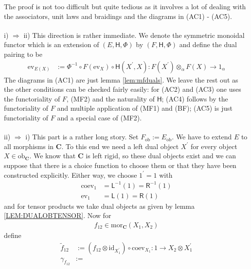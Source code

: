 \begin{prf}
The proof is not too difficult but quite tedious as it involves a lot of dealing with the associators, unit laws and braidings and the diagrams in (AC1) - (AC5).
\\\\
i) $\Rightarrow$ ii)
\qquad
This direction is rather immediate. We denote the symmetric monoidal functor which is an extension of $(E,\mathsf{H},\Phi)$ by $(F,\mathsf{H},\Phi)$ and define the dual pairing to be
\begin{align*}
  \mathrm{ev}_{E(X)}
  &:=
  \Phi^{-1}
  \circ
  F(\mathrm{ev}_{X})
  \circ
  \mathsf{H}(X^{\prime},X)
  \colon
  F(X^{\prime})
  \otimes_{\alpha}
  F(X)
  \to
  1_{\alpha}
\end{align*}
The diagrams in (AC1) are just lemma \ref{lem:mfduals}. We leave the rest out as the other conditions can be checked fairly easily: for (AC2) and (AC3) one uses the functoriality of $F$, (MF2) and the naturality of $\mathsf{H}$; (AC4) follows by the functoriality of $F$ and multiple application of (MF1) and (BF); (AC5) is just functoriality of $F$ and a special case of (MF2).
\\\\
ii) $\Rightarrow$ i)
\qquad
This part is a rather long story. Set $F_{\mathrm{ob}} := E_{\mathrm{ob}}$. We have to extend $E$ to all morphisms in $\mathbf{C}$. To this end we need a left dual object $X^{\prime}$ for every object $X \in \mathrm{ob}_{\mathbf{C}}$. We know that $\mathbf{C}$ is left rigid, so these dual objects exist and we can suppose that there is a choice function to choose them or that they have been constructed explicitly. Either way, we choose $1^{\prime} = 1$ with
\begin{align*}
  \mathrm{coev}_{1}
  &=
  \mathsf{L}^{-1}(1)
  =
  \mathsf{R}^{-1}(1)
  \\
  \mathrm{ev}_{1}
  &=
  \mathsf{L}(1)
  =
  \mathsf{R}(1)
\end{align*}
and for tensor products we take dual objects as given by lemma \ref{LEM:DUALOBTENSOR}. Now for
\begin{align*}
  f_{12}
  \in
  \mathrm{mor}_{\mathbf{C}}(X_{1},X_{2})
\end{align*}
define
\begin{align*}
  \tilde{f}_{12}
  &:=
  \left(
    f_{12}
    \otimes
    \mathrm{id}_{X_{1}^{\prime}}
  \right)
  \circ
  \mathrm{coev}_{X_{1}}
  \colon
  1
  \to
  X_{2}
  \otimes
  X_{1}^{\prime}
  \\
  \gamma_{f_{12}}
  &:=

\end{align*}
\end{prf}

